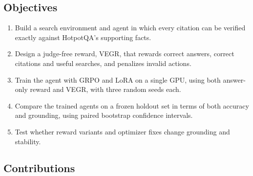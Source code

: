 \subsection{Objectives}\label{sec:1.4}

\begin{enumerate}
\def\labelenumi{\arabic{enumi}.}
\tightlist
\item
  Build a search environment and agent in which every citation can be
  verified exactly against HotpotQA's supporting facts.
\item
  Design a judge-free reward, VEGR, that rewards correct answers,
  correct citations and useful searches, and penalizes invalid actions.
\item
  Train the agent with GRPO and LoRA on a single GPU, using both
  answer-only reward and VEGR, with three random seeds each.
\item
  Compare the trained agents on a frozen holdout set in terms of both
  accuracy and grounding, using paired bootstrap confidence intervals.
\item
  Test whether reward variants and optimizer fixes change grounding and
  stability.
\end{enumerate}

\subsection{Contributions}\label{sec:1.5}

